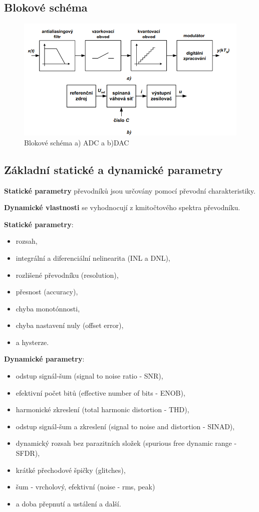 \subsection{Blokové schéma}
   \begin{figure}[h]
   \begin{center}
     \includegraphics[scale=0.6]{images/Blok.png}
   \end{center}
   \caption{Blokové schéma a) ADC a b)DAC}
  \end{figure}
  
\subsection{Základní statické a dynamické parametry}
\textbf{Statické parametry} převodníků jsou určovány pomocí převodní charakteristiky.

\textbf{Dynamické vlastnosti} se vyhodnocují z kmitočtového spektra převodníku.

\textbf{Statické parametry}:
\begin{itemize}
\item rozsah,
\item integrální a diferenciální nelinearita (INL a DNL),
\item rozlišené převodníku (resolution),
\item přesnost (accuracy),
\item chyba monotónnosti,
\item chyba nastavení nuly (offset error),
\item a hysterze.
\end{itemize}

\textbf{Dynamické parametry}:
\begin{itemize}
\item odstup signál-šum (signal to noise ratio - SNR),
\item  efektivní počet bitů (effective number of bits - ENOB),
\item  harmonické zkreslení (total harmonic distortion - THD),
\item  odstup signál-šum a zkreslení (signal to noise and distortion - SINAD),
\item  dynamický rozsah bez parazitních složek (spurious free dynamic range - SFDR),
\item  krátké přechodové špičky (glitches),
\item  šum - vrcholový, efektivní (noise - rms, peak)
\item a doba přepnutí a ustálení a další.
\end{itemize}


